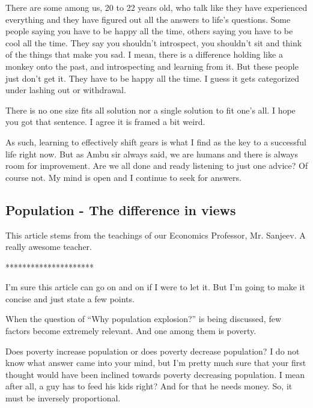 \documentclass[twoside,11pt]{article}
\begin{document}
There are some among us, 20 to 22 years old, who talk like they have experienced everything and they have figured out all the answers to life's questions. Some people saying you have to be happy all the time, others saying you have to be cool all the time. They say you shouldn't introspect, you shouldn't sit and think of the things that make you sad. I mean, there is a difference holding like a monkey onto the past, and introspecting and learning from it. But these people just don't get it. They have to be happy all the time. I guess it gets categorized under lashing out or withdrawal.

There is no one size fits all solution nor a single solution to fit one's all. I hope you got that sentence. I agree it is framed a bit weird.

As such, learning to effectively shift gears is what I find as the key to a successful life right now. But as Ambu sir always said, we are humans and there is always room for improvement. Are we all done and ready listening to just one advice? Of course not. My mind is open and I continue to seek for answers.

\newpage
\begin{center}
  \section{Population - The difference in views}
\end{center}
\bigskip
\bigskip
\bigskip

This article stems from the teachings of our Economics Professor, Mr. Sanjeev. A really awesome teacher.

\bigskip
\begin{center}
*********************
\end{center}

I'm sure this article can go on and on if I were to let it. But I'm going to make it concise and just state a few points.

When the question of ``Why population explosion?'' is being discussed, few factors become extremely relevant. And one among them is poverty.

Does poverty increase population or does poverty decrease population? I do not know what answer came into your mind, but I'm pretty much sure that your first thought would have been inclined towards poverty decreasing population. I mean after all, a guy has to feed his kids right? And for that he needs money. So, it must be inversely proportional.
\end{document}
